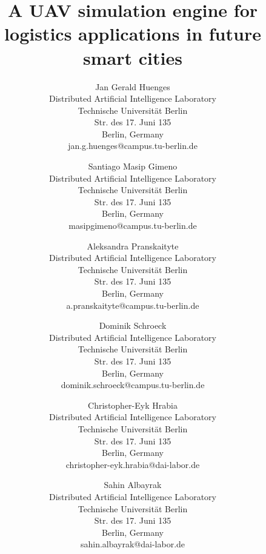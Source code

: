 \documentclass{scspaperproc}
\theoremstyle{scsthe}
\begin{document}
\title{A UAV simulation engine for logistics applications in future smart cities}

\author{Jan Gerald Huenges \\[12pt]
Distributed Artificial Intelligence Laboratory \\
Technische Universität Berlin\\
Str. des 17. Juni 135 \\
Berlin, Germany \\
jan.g.huenges@campus.tu-berlin.de \\
\and
Santiago Masip Gimeno \\ [12pt]
Distributed Artificial Intelligence Laboratory \\
Technische Universität Berlin \\
Str. des 17. Juni 135 \\
Berlin, Germany \\
masipgimeno@campus.tu-berlin.de \\
\and
Aleksandra Pranskaityte \\ [12pt]
Distributed Artificial Intelligence Laboratory \\
Technische Universität Berlin \\
Str. des 17. Juni 135 \\
Berlin, Germany \\
a.pranskaityte@campus.tu-berlin.de \\
\and
Dominik Schroeck \\ [12pt]
Distributed Artificial Intelligence Laboratory \\
Technische Universität Berlin \\
Str. des 17. Juni 135 \\
Berlin, Germany \\
dominik.schroeck@campus.tu-berlin.de \\
\and
Christopher-Eyk Hrabia \\ [12pt]
Distributed Artificial Intelligence Laboratory \\
Technische Universität Berlin \\
Str. des 17. Juni 135 \\
Berlin, Germany \\
christopher-eyk.hrabia@dai-labor.de \\
\and
Sahin Albayrak\\[12pt]
Distributed Artificial Intelligence Laboratory \\
Technische Universität Berlin \\
Str. des 17. Juni 135 \\
Berlin, Germany \\
sahin.albayrak@dai-labor.de
}
\maketitle
\end{document}
